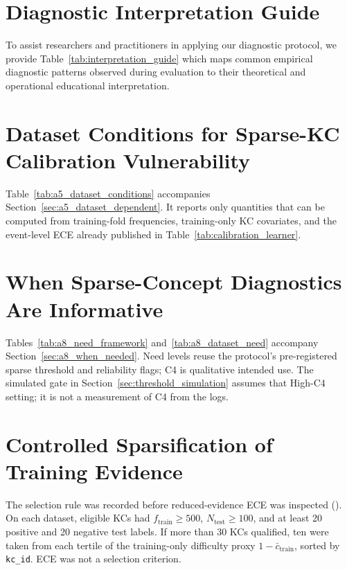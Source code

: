 

\clearpage

\section{Diagnostic Interpretation Guide}
\label{app:interpretation}
To assist researchers and practitioners in applying our diagnostic protocol, we provide Table~\ref{tab:interpretation_guide} which maps common empirical diagnostic patterns observed during evaluation to their theoretical and operational educational interpretation.



\section{Dataset Conditions for Sparse-KC Calibration Vulnerability}
\label{app:dataset_conditions}
Table~\ref{tab:a5_dataset_conditions} accompanies Section~\ref{sec:a5_dataset_dependent}. It reports only quantities that can be computed from training-fold frequencies, training-only KC covariates, and the event-level ECE already published in Table~\ref{tab:calibration_learner}.



\section{When Sparse-Concept Diagnostics Are Informative}
\label{app:a8_need}
Tables~\ref{tab:a8_need_framework} and~\ref{tab:a8_dataset_need} accompany Section~\ref{sec:a8_when_needed}. Need levels reuse the protocol's pre-registered sparse threshold and reliability flags; C4 is qualitative intended use. The simulated gate in Section~\ref{sec:threshold_simulation} assumes that High-C4 setting; it is not a measurement of C4 from the logs.




\section{Controlled Sparsification of Training Evidence}
\label{app:a9_sparsify}
The selection rule was recorded before reduced-evidence ECE was inspected ().
On each dataset, eligible KCs had $f_{\mathrm{train}}\ge 500$, $N_{\mathrm{test}}\ge 100$, and at least 20 positive and 20 negative test labels.
If more than 30 KCs qualified, ten were taken from each tertile of the training-only difficulty proxy $1-\bar{c}_{\mathrm{train}}$, sorted by \texttt{kc\_id}.
ECE was not a selection criterion.

